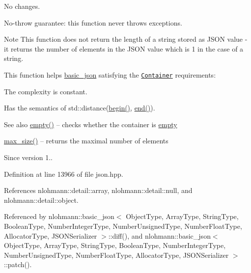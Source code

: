 No changes.

No-\/throw guarantee\+: this function never throws exceptions.

\begin{DoxyNote}{Note}
This function does not return the length of a string stored as J\+S\+ON value -\/ it returns the number of elements in the J\+S\+ON value which is 1 in the case of a string.
\end{DoxyNote}
This function helps {\ttfamily \hyperlink{classnlohmann_1_1basic__json}{basic\+\_\+json}} satisfying the \href{http://en.cppreference.com/w/cpp/concept/Container}{\tt Container} requirements\+:
\begin{DoxyItemize}
\item The complexity is constant.
\item Has the semantics of {\ttfamily std\+::distance(\hyperlink{classnlohmann_1_1basic__json_a0ff28dac23f2bdecee9564d07f51dcdc}{begin()}, \hyperlink{classnlohmann_1_1basic__json_a13e032a02a7fd8a93fdddc2fcbc4763c}{end()})}.
\end{DoxyItemize}

\begin{DoxySeeAlso}{See also}
\hyperlink{classnlohmann_1_1basic__json_a1a86d444bfeaa9518d2421aedd74444a}{empty()} -- checks whether the container is \hyperlink{classnlohmann_1_1basic__json_a1a86d444bfeaa9518d2421aedd74444a}{empty} 

\hyperlink{classnlohmann_1_1basic__json_a2f47d3c6a441c57dd2be00449fbb88e1}{max\+\_\+size()} -- returns the maximal number of elements
\end{DoxySeeAlso}
\begin{DoxySince}{Since}
version 1.. 
\end{DoxySince}


Definition at line 13966 of file json.\+hpp.



References nlohmann\+::detail\+::array, nlohmann\+::detail\+::null, and nlohmann\+::detail\+::object.



Referenced by nlohmann\+::basic\+\_\+json$<$ Object\+Type, Array\+Type, String\+Type, Boolean\+Type, Number\+Integer\+Type, Number\+Unsigned\+Type, Number\+Float\+Type, Allocator\+Type, J\+S\+O\+N\+Serializer $>$\+::diff(), and nlohmann\+::basic\+\_\+json$<$ Object\+Type, Array\+Type, String\+Type, Boolean\+Type, Number\+Integer\+Type, Number\+Unsigned\+Type, Number\+Float\+Type, Allocator\+Type, J\+S\+O\+N\+Serializer $>$\+::patch().


